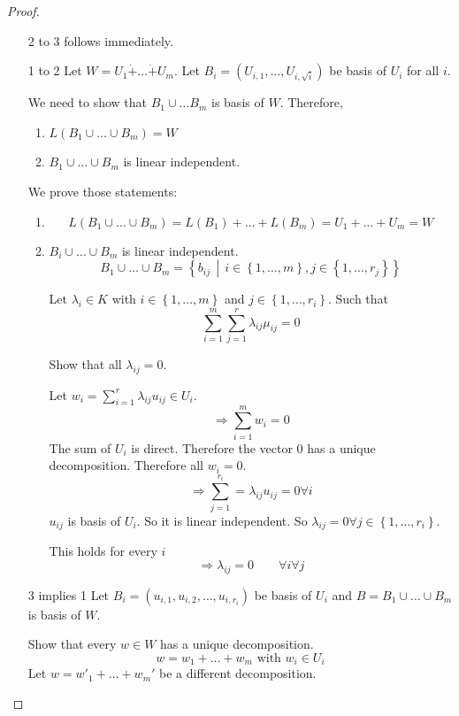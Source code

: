 \documentclass[a4paper,landscape,twocolumn]{article}
\newcommand\set[1]{\left\{#1\right\}}
\newcommand\setdef[2]{\left\{#1\,\middle|\,#2\right\}}
\begin{document}
\begin{proof}
  \begin{enumerate}
    \item[2 to 3] follows immediately.
    \item[1 to 2]
      Let $W = U_1 \dot{+} \dots \dot{+} U_m$.
      Let $B_i = (U_{i,1}, \dots, U_{i,\sqrt{i}})$ be basis of $U_i$ for all $i$.

      We need to show that $B_1 \cup \dots B_m$ is basis of $W$. Therefore,
      \begin{enumerate}
        \item $L(B_1 \cup \dots \cup B_m) = W$
        \item $B_1 \cup \dots \cup B_m$ is linear independent.
      \end{enumerate}
      We prove those statements:
      \begin{enumerate}
        \item \[ L(B_1 \cup \dots \cup B_m) = L(B_1) + \dots + L(B_m) = U_1 + \dots + U_m = W \]
        \item $B_i \cup \dots \cup B_m$ is linear independent.
          \[ B_1 \cup \dots \cup B_m = \setdef{b_{ij}}{i \in \set{1, \dots, m}, j \in \set{1, \dots, r_j}} \]

          Let $\lambda_i \in K$ with $i \in \set{1, \dots, m}$ and $j \in \set{1, \dots, r_i}$.
          Such that
          \[ \sum_{i=1}^m \sum_{j=1}^r \lambda_{ij} \mu_{ij} = 0 \]

          Show that all $\lambda_{ij} = 0$.

          Let $w_i = \sum_{i=1}^r \lambda_{ij} u_{ij} \in U_i$.
          \[ \Rightarrow \sum_{i=1}^m w_i = 0 \]
          The sum of $U_i$ is direct.
          Therefore the vector $0$ has a unique decomposition.
          Therefore all $w_i = 0$.
          \[ \Rightarrow \sum_{j=1}^{r_i} = \lambda_{ij} u_{ij} = 0 \forall i \]
          $u_{ij}$ is basis of $U_i$.  So it is linear independent.
          So $\lambda_{ij} = 0 \forall j \in \set{1, \dots, r_i}$.

          This holds for every $i$
          \[ \Rightarrow \lambda_{ij} = 0 \qquad \forall i \forall j \]
      \end{enumerate}
    \item[3 implies 1]
      Let $B_i = (u_{i,1}, u_{i,2}, \dots, u_{i,r_i})$ be basis of $U_i$
      and $B = B_1 \cup \dots \cup B_m$ is basis of $W$.

      Show that every $w \in W$ has a unique decomposition.
      \[ w = w_1 + \dots + w_m \text{ with } w_i \in U_i \]
      Let $w = w'_1 + \dots + w_m'$ be a different decomposition.


\end{enumerate}
\end{proof}
\end{document}
